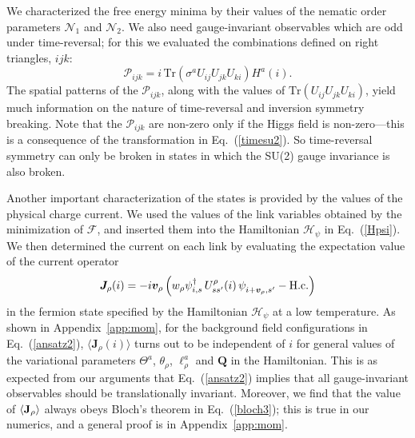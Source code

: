 \documentclass[aps,prb,preprint,onecolumn,citeautoscript,superscriptaddress,footinbib,
eqsecnum]{revtex4-1}
\newcommand{\beq}{\begin{equation}}
\newcommand{\eeq}{\end{equation}}
\begin{document}
We characterized the free energy minima by their values 
of the nematic order parameters $\mathcal{N}_1$ and $\mathcal{N}_2$. We also need gauge-invariant observables
which are odd under time-reversal; for this we evaluated 
the combinations defined on right triangles, $ijk$:
\beq
\mathcal{P}_{ijk} = 
i \, \mbox{Tr} \left( \sigma^a U_{ij} U_{jk} U_{ki} \right)
H^a (i) .
\eeq
The spatial patterns of the $\mathcal{P}_{ijk}$, along
with the values of $\mbox{Tr} \left( U_{ij} U_{jk} U_{ki} \right)$, yield much information on the nature of time-reversal
and inversion symmetry breaking. Note that the $\mathcal{P}_{ijk}$
are non-zero only if the Higgs field is non-zero---this is a consequence of the transformation in Eq.~(\ref{timesu2}). So time-reversal symmetry can only be broken in states in which the
SU(2) gauge invariance is also broken.

Another important characterization of the states is provided by the values of the physical charge current. We used the values of the link variables obtained by the minimization of $\mathcal{F}$, and inserted them into the Hamiltonian $\mathcal{H}_\psi$ in 
Eq.~(\ref{Hpsi}).
We then determined the current on each link by evaluating the expectation value of the current operator
\beq
{\bm J}_\rho (i) =  - i {\bm v}_\rho \left( w_\rho  \psi_{i ,s}^\dagger \, U_{ss'}^\rho (i) \, \psi_{i + {\bm v}_\rho, s'}^{\vphantom \dagger}  - \mbox{H.c.} \right) \label{Jrho}
\eeq
in the fermion state specified by the Hamiltonian $\mathcal{H}_\psi$ at a low temperature. As shown in 
Appendix~\ref{app:mom}, for the background field configurations in Eq.~(\ref{ansatz2}), $\langle 
{\bm J}_\rho (i) \rangle$ turns
out to be independent of $i$ for general values of the variational parameters
$\Theta^a$, $\theta_\rho$, $\ell^a_\rho$ and ${\bm Q}$ in the Hamiltonian. This is as expected
from our arguments that Eq.~(\ref{ansatz2}) implies that all gauge-invariant observables should be translationally invariant. Moreover, we find that the value of $\langle {\bf J}_\rho \rangle$
always obeys Bloch's theorem in Eq.~(\ref{bloch3}); this is true in our numerics, 
and a general proof is in Appendix~\ref{app:mom}.
\end{document}
